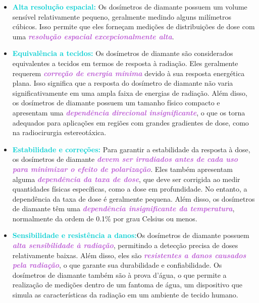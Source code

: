 \documentclass[11pt,a4paper]{article}
\newcounter{exemplo}
\begin{document}
	\begin{exemplo}
		\begin{itemize}
			\item \textcolor{DarkTurquoise}{\textbf{Alta resolução espacial:}} Os dosímetros de diamante possuem um volume sensível relativamente pequeno, geralmente medindo alguns milímetros cúbicos. Isso permite que eles forneçam medições de distribuições de dose com uma \textcolor{MediumOrchid}{\textit{\textbf{resolução espacial excepcionalmente alta}}}.
			\item \textcolor{DarkTurquoise}{\textbf{Equivalência a tecidos:}} Os dosímetros de diamante são considerados equivalentes a tecidos em termos de resposta à radiação. Eles geralmente requerem \textcolor{MediumOrchid}{\textit{\textbf{correção de energia mínima}}} devido à sua resposta energética plana. Isso significa que a resposta do dosímetro de diamante não varia significativamente em uma ampla faixa de energias de radiação. Além disso, os dosímetros de diamante possuem um tamanho físico compacto e apresentam uma \textcolor{MediumOrchid}{\textit{\textbf{dependência direcional insignificante}}}, o que os torna adequados para aplicações em regiões com grandes gradientes de dose, como na radiocirurgia estereotáxica.
			\item \textcolor{DarkTurquoise}{\textbf{Estabilidade e correções:}} Para garantir a estabilidade da resposta à dose, os dosímetros de diamante \textcolor{MediumOrchid}{\textit{\textbf{devem ser irradiados antes de cada uso para minimizar o efeito de polarização}}}. Eles também apresentam alguma \textcolor{MediumOrchid}{\textit{\textbf{dependência da taxa de dose}}}, que deve ser corrigida ao medir quantidades físicas específicas, como a dose em profundidade. No entanto, a dependência da taxa de dose é geralmente pequena. Além disso, os dosímetros de diamante têm uma \textcolor{MediumOrchid}{\textit{\textbf{dependência insignificante da temperatura}}}, normalmente da ordem de 0.1\% por grau Celsius ou menos.
			\item \textcolor{DarkTurquoise}{\textbf{Sensibilidade e resistência a danos:}}Os dosímetros de diamante possuem \textcolor{MediumOrchid}{\textit{\textbf{alta sensibilidade à radiação}}}, permitindo a detecção precisa de doses relativamente baixas. Além disso, eles são \textcolor{MediumOrchid}{\textit{\textbf{resistentes a danos causados pela radiação}}}, o que garante sua durabilidade e confiabilidade. Os dosímetros de diamante também são à prova d'água, o que permite a realização de medições dentro de um fantoma de água, um dispositivo que simula as características da radiação em um ambiente de tecido humano.
		\end{itemize}
	\end{exemplo}
\end{document}
